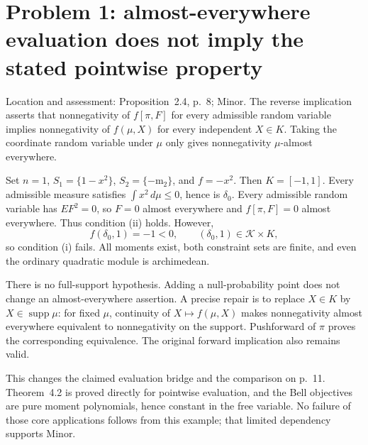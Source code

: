 \documentclass[10pt]{article}
\begin{document}
\section*{Problem 1: almost-everywhere evaluation does not imply the stated pointwise property}
Location and assessment: Proposition 2.4, p. 8; Minor. The reverse implication asserts that nonnegativity of \(f[\pi,F]\) for every admissible random variable implies nonnegativity of \(f(\mu,X)\) for every independent \(X\in K\). Taking the coordinate random variable under \(\mu\) only gives nonnegativity \(\mu\)-almost everywhere.\par
Set \(n=1\), \(S_1=\{1-x^2\}\), \(S_2=\{-\mathrm{m}_2\}\), and \(f=-x^2\). Then \(K=[-1,1]\). Every admissible measure satisfies \(\int x^2\,d\mu\le0\), hence is \(\delta_0\). Every admissible random variable has \(E F^2=0\), so \(F=0\) almost everywhere and \(f[\pi,F]=0\) almost everywhere. Thus condition (ii) holds. However, \[f(\delta_0,1)=-1<0,\qquad (\delta_0,1)\in\mathcal K\times K,\] so condition (i) fails. All moments exist, both constraint sets are finite, and even the ordinary quadratic module is archimedean.\par
There is no full-support hypothesis. Adding a null-probability point does not change an almost-everywhere assertion. A precise repair is to replace \(X\in K\) by \(X\in\operatorname{supp}\mu\): for fixed \(\mu\), continuity of \(X\mapsto f(\mu,X)\) makes nonnegativity almost everywhere equivalent to nonnegativity on the support. Pushforward of \(\pi\) proves the corresponding equivalence. The original forward implication also remains valid.\par
This changes the claimed evaluation bridge and the comparison on p. 11. Theorem 4.2 is proved directly for pointwise evaluation, and the Bell objectives are pure moment polynomials, hence constant in the free variable. No failure of those core applications follows from this example; that limited dependency supports Minor.\par
\end{document}
